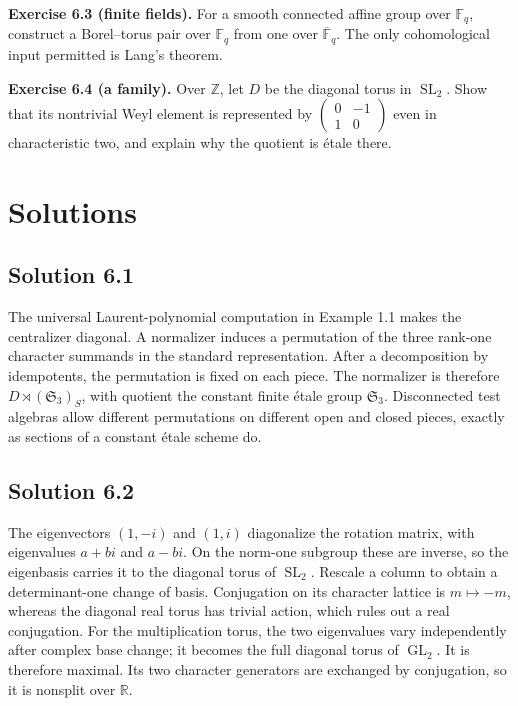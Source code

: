 \documentclass[11pt,a4paper,openany]{report}
\begin{document}
\textbf{Exercise 6.3 (finite fields).} For a smooth connected affine group over \(\mathbb F_q\), construct a Borel--torus pair over \(\mathbb F_q\) from one over \(\overline{\mathbb F}_q\). The only cohomological input permitted is Lang's theorem.

\textbf{Exercise 6.4 (a family).} Over \(\mathbb Z\), let \(D\) be the diagonal torus in \(\operatorname{SL}_2\). Show that its nontrivial Weyl element is represented by \(\begin{pmatrix}0&-1\\1&0\end{pmatrix}\) even in characteristic two, and explain why the quotient is étale there.

\section{Solutions}\label{AG-RG-01-solutions}

\subsection{Solution 6.1}\label{AG-RG-01-solution-6.1}

The universal Laurent-polynomial computation in Example 1.1 makes the centralizer diagonal. A normalizer induces a permutation of the three rank-one character summands in the standard representation. After a decomposition by idempotents, the permutation is fixed on each piece. The normalizer is therefore \(D\rtimes(\mathfrak S_3)_S\), with quotient the constant finite étale group \(\mathfrak S_3\). Disconnected test algebras allow different permutations on different open and closed pieces, exactly as sections of a constant étale scheme do.

\subsection{Solution 6.2}\label{AG-RG-01-solution-6.2}

The eigenvectors \((1,-i)\) and \((1,i)\) diagonalize the rotation matrix, with eigenvalues \(a+bi\) and \(a-bi\). On the norm-one subgroup these are inverse, so the eigenbasis carries it to the diagonal torus of \(\operatorname{SL}_2\). Rescale a column to obtain a determinant-one change of basis. Conjugation on its character lattice is \(m\mapsto-m\), whereas the diagonal real torus has trivial action, which rules out a real conjugation. For the multiplication torus, the two eigenvalues vary independently after complex base change; it becomes the full diagonal torus of \(\operatorname{GL}_2\). It is therefore maximal. Its two character generators are exchanged by conjugation, so it is nonsplit over \(\mathbb R\).
\end{document}
